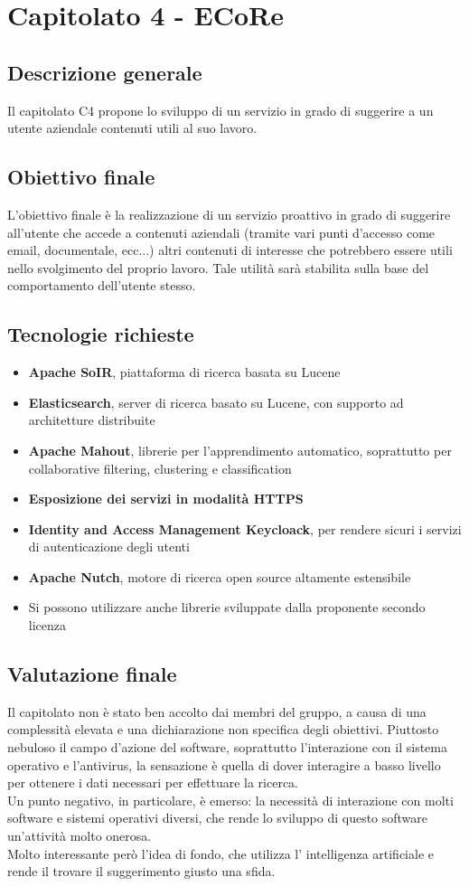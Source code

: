 \documentclass[StudioDiFattibilità.tex]{subfiles}
\begin{document}
\chapter{Capitolato 4 - ECoRe}
\section{Descrizione generale}
Il capitolato C4 propone lo sviluppo di un servizio in grado di suggerire a un utente aziendale contenuti utili al suo lavoro.
\section{Obiettivo finale}
L'obiettivo finale è la realizzazione di un servizio proattivo in grado di suggerire all'utente che accede a contenuti aziendali (tramite vari punti d'accesso come email, documentale, ecc...) altri contenuti di interesse che potrebbero essere utili nello svolgimento del proprio lavoro. Tale utilità sarà stabilita sulla base del comportamento dell'utente stesso.
\section{Tecnologie richieste}
\begin{itemize}
	\item \textbf{Apache SoIR}, piattaforma di ricerca basata su Lucene
	\item \textbf{Elasticsearch}, server di ricerca basato su Lucene, con supporto ad architetture distribuite
	\item \textbf{Apache Mahout}, librerie per l'apprendimento automatico, soprattutto per collaborative filtering, clustering e classification
	\item \textbf{Esposizione dei servizi in modalità HTTPS}
	\item \textbf{Identity and Access Management Keycloack}, per rendere sicuri i servizi di autenticazione degli utenti
	\item \textbf{Apache Nutch}, motore di ricerca open source altamente estensibile
	\item Si possono utilizzare anche librerie  sviluppate dalla proponente secondo licenza
\end{itemize}
\section{Valutazione finale}
Il capitolato non è stato ben accolto dai membri del gruppo, a causa di una complessità elevata e una dichiarazione non specifica degli obiettivi. Piuttosto nebuloso il campo d'azione del software, soprattutto l'interazione con il sistema operativo e l'antivirus, la sensazione è quella di dover interagire a basso livello per ottenere i dati necessari per effettuare la ricerca.\\
Un punto negativo, in particolare, è emerso: la necessità di interazione con molti software e sistemi operativi diversi, che rende lo sviluppo di questo software un'attività molto onerosa.\\
Molto interessante però l'idea di fondo, che utilizza l' intelligenza artificiale e rende il trovare il suggerimento giusto una sfida.
\end{document}
